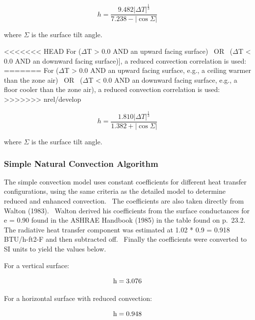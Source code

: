 \begin{equation}
h = \frac{{9.482{{\left| {\Delta T} \right|}^{\frac{1}{3}}}}}{{7.238 - \left| {\cos \Sigma } \right|}}
\end{equation}

where $\Sigma$ is the surface tilt angle.

<<<<<<< HEAD
For ($\Delta$T \textgreater{} 0.0 AND an upward facing surface)~ OR~ ($\Delta$T \textless{} 0.0 AND an downward facing surface)], a reduced convection correlation is used:
=======
For ($\Delta$T \textgreater{} 0.0 AND an upward facing surface, e.g., a ceiling warmer than the zone air)~ OR~ ($\Delta$T \textless{} 0.0 AND an downward facing surface, e.g., a floor cooler than the zone air), a reduced convection correlation is used:
>>>>>>> nrel/develop

\begin{equation}
h = \frac{{1.810{{\left| {\Delta T} \right|}^{\frac{1}{3}}}}}{{1.382 + \left| {\cos \Sigma } \right|}}
\end{equation}

where $\Sigma$ is the surface tilt angle.

\subsubsection{Simple Natural Convection Algorithm}\label{simple-natural-convection-algorithm}

The simple convection model uses constant coefficients for different heat transfer configurations, using the same criteria as the detailed model to determine reduced and enhanced convection.~ The coefficients are also taken directly from Walton (1983).~ Walton derived his coefficients from the surface conductances for e = 0.90 found in the ASHRAE Handbook (1985) in the table found on p.~23.2.~ The radiative heat transfer component was estimated at 1.02 * 0.9 = 0.918 BTU/h-ft2-F and then subtracted off.~ Finally the coefficients were converted to SI units to yield the values below.

For a vertical surface:

\begin{equation}
{\rm{h  =  3}}{\rm{.076}}
\end{equation}

For a horizontal surface with reduced convection:

\begin{equation}
{\rm{h  =  0}}{\rm{.948}}
\end{equation}


